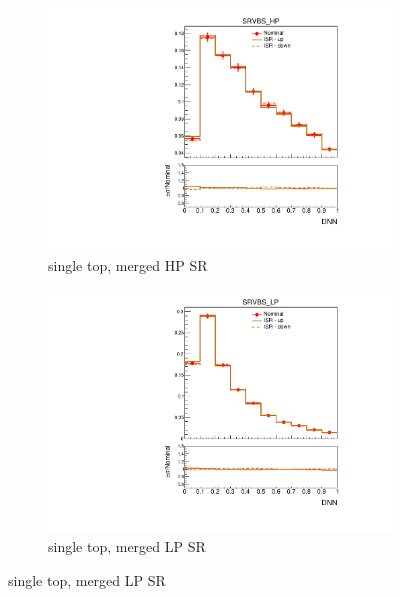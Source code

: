\begin{figure}[p]
\begin{subfigure}[b]{0.3\textwidth}
        \includegraphics[width=\textwidth]{figures/1lep/PDFUnc/ISR/stop_0ptag1pfat0pjet_0ptv_SRVBS_HP_DNN_SysTheoryISR_stop__1up_Norm.pdf}
        \caption{single top, merged HP SR}
    \end{subfigure}
    \begin{subfigure}[b]{0.3\textwidth}
        \includegraphics[width=\textwidth]{figures/1lep/PDFUnc/ISR/stop_0ptag1pfat0pjet_0ptv_SRVBS_LP_DNN_SysTheoryISR_stop__1up_Norm.pdf}
        \caption{single top, merged LP SR}
    \end{subfigure}

\end{figure}
